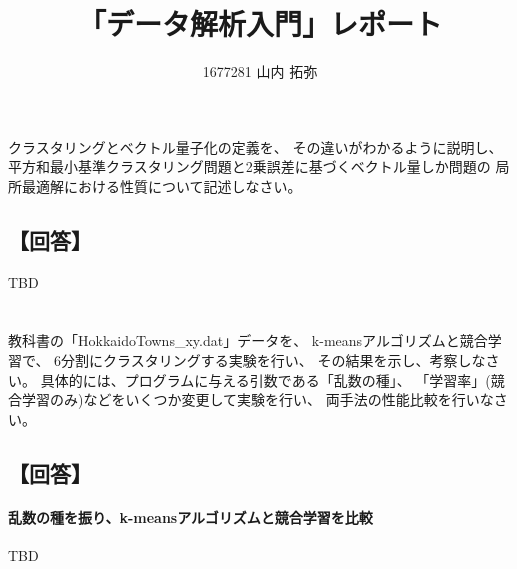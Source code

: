 \documentclass[a4j]{jarticle}
\title{「データ解析入門」レポート}
\author{1677281 山内 拓弥}
\begin{document}
\maketitle

\section{}
クラスタリングとベクトル量子化の定義を、
その違いがわかるように説明し、
平方和最小基準クラスタリング問題と2乗誤差に基づくベクトル量しか問題の
局所最適解における性質について記述しなさい。

\subsection{【回答】}
TBD

\section{}
教科書の「HokkaidoTowns\_xy\@.dat」データを、 k-meansアルゴリズムと競合学習で、
6分割にクラスタリングする実験を行い、 その結果を示し、考察しなさい。
具体的には、プログラムに与える引数である「乱数の種」、
「学習率」(競合学習のみ)などをいくつか変更して実験を行い、
両手法の性能比較を行いなさい。

\subsection{【回答】}

\paragraph{乱数の種を振り、k-meansアルゴリズムと競合学習を比較}
TBD
\end{document}
